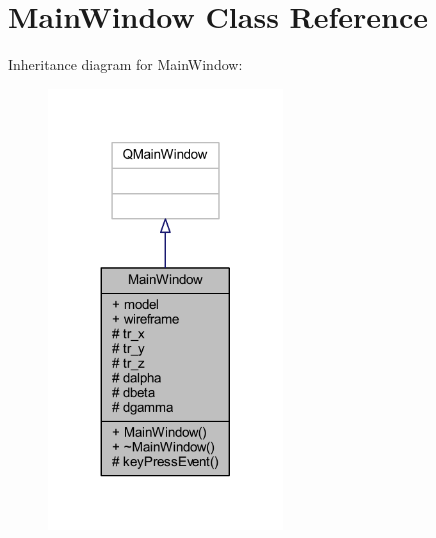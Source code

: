 \hypertarget{class_main_window}{}\section{Main\+Window Class Reference}
\label{class_main_window}


Inheritance diagram for Main\+Window\+:
\nopagebreak
\begin{figure}[H]
\begin{center}
\leavevmode
\includegraphics[width=176pt]{class_main_window__inherit__graph}
\end{center}
\end{figure}


